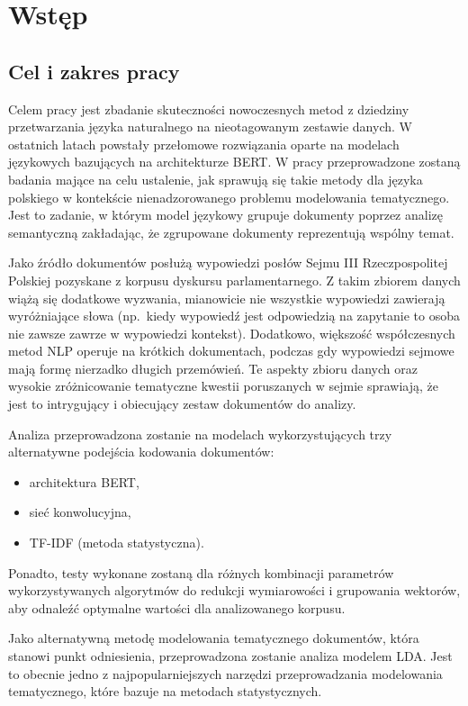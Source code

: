 
\chapter{Wstęp}
 
\section{Cel i zakres pracy}
	Celem pracy jest zbadanie skuteczności nowoczesnych metod z dziedziny przetwarzania języka naturalnego na nieotagowanym zestawie danych.
	W ostatnich latach powstały przełomowe rozwiązania oparte na modelach językowych bazujących na architekturze BERT\@.
	W pracy przeprowadzone zostaną badania mające na celu ustalenie, jak sprawują się takie metody dla języka polskiego w kontekście nienadzorowanego problemu modelowania tematycznego.
	Jest to zadanie, w którym model językowy grupuje dokumenty poprzez analizę semantyczną zakładając,
		że zgrupowane dokumenty reprezentują wspólny temat.
	
	Jako źródło dokumentów posłużą wypowiedzi posłów Sejmu III Rzeczpospolitej Polskiej pozyskane z korpusu dyskursu parlamentarnego.
	Z takim zbiorem danych wiążą się dodatkowe wyzwania, mianowicie nie wszystkie wypowiedzi zawierają wyróżniające słowa
		(np.\ kiedy wypowiedź jest odpowiedzią na zapytanie to osoba nie zawsze zawrze w wypowiedzi kontekst).
	Dodatkowo, większość współczesnych metod NLP operuje na krótkich dokumentach, podczas gdy wypowiedzi sejmowe mają formę nierzadko długich przemówień.
	Te aspekty zbioru danych oraz wysokie zróżnicowanie tematyczne kwestii poruszanych w sejmie sprawiają, że jest to intrygujący i obiecujący zestaw dokumentów do analizy.

	Analiza przeprowadzona zostanie na modelach wykorzystujących trzy alternatywne podejścia kodowania dokumentów:
	\begin{itemize}
		\item architektura BERT,
		\item sieć konwolucyjna,
		\item TF-IDF (metoda statystyczna).
	\end{itemize}
	Ponadto, testy wykonane zostaną dla różnych kombinacji parametrów wykorzystywanych algorytmów do redukcji wymiarowości i grupowania wektorów,
		aby odnaleźć optymalne wartości dla analizowanego korpusu.

	Jako alternatywną metodę modelowania tematycznego dokumentów, która stanowi punkt odniesienia,
		przeprowadzona zostanie analiza modelem LDA\@.
	Jest to obecnie jedno z najpopularniejszych narzędzi przeprowadzania modelowania tematycznego\cite{LDA_popularity},
		które bazuje na metodach statystycznych.

